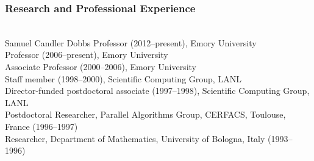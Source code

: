 \subsubsection*{Research and Professional Experience}
\vspace*{-1ex}
\vspace*{-2ex}
\begin{tabbing}
\hspace*{3em} \= \\
\> Samuel Candler Dobbs Professor (2012--present), Emory University \\ 
\> Professor (2006--present), Emory University\\ 
\> Associate Professor (2000--2006), Emory 
   University \\
\> Staff member (1998--2000), Scientific Computing Group, LANL \\ 
\> Director-funded postdoctoral associate (1997--1998), Scientific 
  Computing Group, LANL\\
\> Postdoctoral Researcher, Parallel Algorithms Group,
  CERFACS, Toulouse, France (1996--1997)\\
\> Researcher, Department of Mathematics, University of Bologna,
   Italy (1993--1996)\\
\end{tabbing}
\vspace*{-4ex}

